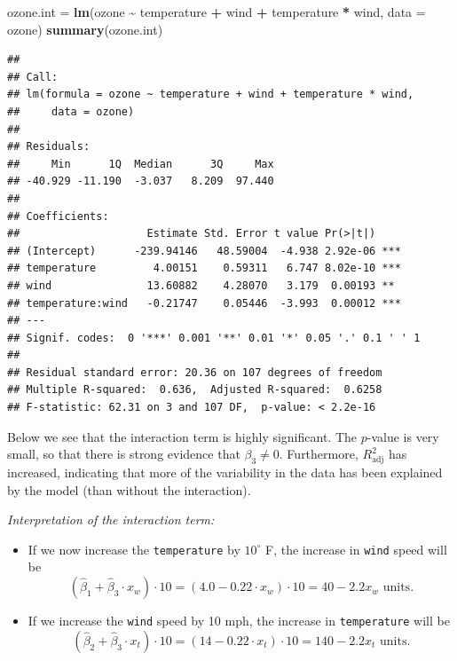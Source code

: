 \documentclass[
  ignorenonframetext,
]{beamer}
\newenvironment{Shaded}{\begin{snugshade}}{\end{snugshade}}
\newcommand{\AttributeTok}[1]{\textcolor[rgb]{0.13,0.29,0.53}{#1}}
\newcommand{\FunctionTok}[1]{\textcolor[rgb]{0.13,0.29,0.53}{\textbf{#1}}}
\newcommand{\NormalTok}[1]{#1}
\newcommand{\OtherTok}[1]{\textcolor[rgb]{0.56,0.35,0.01}{#1}}
\newcommand{\SpecialCharTok}[1]{\textcolor[rgb]{0.81,0.36,0.00}{\textbf{#1}}}
\begin{document}
\begin{frame}[fragile]
\footnotesize

\begin{Shaded}
\begin{Highlighting}[]
\NormalTok{ozone.int }\OtherTok{=} \FunctionTok{lm}\NormalTok{(ozone }\SpecialCharTok{\textasciitilde{}}\NormalTok{ temperature }\SpecialCharTok{+}\NormalTok{ wind }\SpecialCharTok{+}\NormalTok{ temperature }\SpecialCharTok{*}\NormalTok{ wind, }\AttributeTok{data =}\NormalTok{ ozone)}
\FunctionTok{summary}\NormalTok{(ozone.int)}
\end{Highlighting}
\end{Shaded}

\begin{verbatim}
## 
## Call:
## lm(formula = ozone ~ temperature + wind + temperature * wind, 
##     data = ozone)
## 
## Residuals:
##     Min      1Q  Median      3Q     Max 
## -40.929 -11.190  -3.037   8.209  97.440 
## 
## Coefficients:
##                    Estimate Std. Error t value Pr(>|t|)    
## (Intercept)      -239.94146   48.59004  -4.938 2.92e-06 ***
## temperature         4.00151    0.59311   6.747 8.02e-10 ***
## wind               13.60882    4.28070   3.179  0.00193 ** 
## temperature:wind   -0.21747    0.05446  -3.993  0.00012 ***
## ---
## Signif. codes:  0 '***' 0.001 '**' 0.01 '*' 0.05 '.' 0.1 ' ' 1
## 
## Residual standard error: 20.36 on 107 degrees of freedom
## Multiple R-squared:  0.636,  Adjusted R-squared:  0.6258 
## F-statistic: 62.31 on 3 and 107 DF,  p-value: < 2.2e-16
\end{verbatim}

\normalsize
\end{frame}

\begin{frame}
Below we see that the interaction term is highly significant. The
\(p\)-value is very small, so that there is strong evidence that
\(\beta_3 \neq 0\). Furthermore, \(R^2_{\text{adj}}\) has increased,
indicating that more of the variability in the data has been explained
by the model (than without the interaction).
\end{frame}

\begin{frame}[fragile]
\emph{Interpretation of the interaction term:}

\begin{itemize}
\item
  If we now increase the \texttt{temperature} by \(10^{\circ}\) F, the
  increase in \texttt{wind} speed will be
  \[(\hat \beta_1+\hat \beta_3 \cdot x_w) \cdot 10 = (4.0 -0.22 \cdot x_w) \cdot 10 = 40-2.2 x_w \text{ units}.\]
\item
  If we increase the \texttt{wind} speed by 10 mph, the increase in
  \texttt{temperature} will be
  \[(\hat \beta_2 + \hat \beta_3 \cdot x_t) \cdot 10 = (14 -0.22 \cdot x_t) \cdot 10 = 140-2.2 x_t \text{ units}.\]
\end{itemize}
\end{frame}
\end{document}
